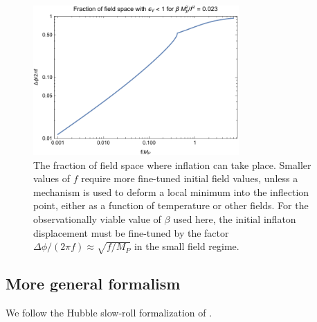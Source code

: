 \documentclass[aps,amsfonts,amsmath,prd,preprint,nofootinbib,superscriptaddress]{revtex4}
\newcommand{\Mp}{{M_{P}}}
\begin{document}
\begin{figure}[!h]
  \centering
    \includegraphics[width=0.7\textwidth]{figures/SRfraction.pdf}
    \caption{The fraction of field space where inflation can take place.  Smaller values of $f$ require more fine-tuned initial field values, unless a 
    mechanism is used to deform a local minimum into the inflection point, either
    as a function of temperature or other fields.  For the observationally viable value of $\beta$ used here, the initial inflaton displacement must be fine-tuned by the factor $\Delta\phi/(2\pi f) \approx \sqrt{f/\Mp}$ in the small field regime.}
\end{figure}







\subsection{More general formalism}


We follow the Hubble slow-roll formalization of \cite{Liddle:1994dx}.  
\end{document}
